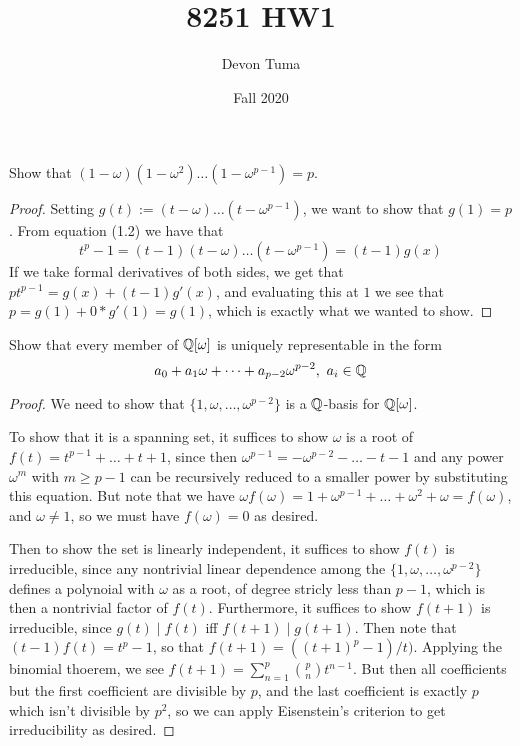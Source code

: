 \documentclass[11pt]{article}
\title{8251 HW1}
\author{Devon Tuma}
\date{Fall 2020}
\begin{document}
\maketitle

Show that $(1 - \omega)(1 - \omega^2)\dots(1 - \omega^{p-1}) = p$.

\begin{proof}
  Setting $g(t) := (t - \omega)\dots(t - \omega^{p-1})$, we want to show that $g(1) = p$.
  From equation (1.2) we have that
  \begin{equation*}
    t^p - 1 = (t - 1)(t - \omega)\dots(t - \omega^{p-1}) = (t-1)g(x)
  \end{equation*}
  If we take formal derivatives of both sides, we get that $pt^{p-1} = g(x) + (t-1)g'(x)$, and evaluating this at $1$ we see that $p = g(1) + 0 * g'(1) = g(1)$, which is exactly what we wanted to show.
\end{proof}


Show that every member of $\mathbb{Q}[\omega]$ is uniquely representable in the form $$a_0 + a_1\omega + \dots + a_{p-2}\omega^{p-2}, \ a_i \in \mathbb{Q}$$

\begin{proof}
  We need to show that $\{1, \omega, \dots, \omega^{p-2}\}$ is a $\mathbb{Q}$-basis for $\mathbb{Q}[\omega]$.
  
  To show that it is a spanning set, it suffices to show $\omega$ is a root of $f(t) = t^{p-1} + \dots + t + 1$, since then $\omega^{p-1} = -\omega^{p-2}-\dots-t-1$ and any power $\omega^m$ with $m \ge p - 1$ can be recursively reduced to a smaller power by substituting this equation.
  But note that we have $\omega f(\omega) = 1 + \omega^{p-1} + \dots + \omega^2 + \omega = f(\omega)$, and $\omega \ne 1$, so we must have $f(\omega) = 0$ as desired.

  Then to show the set is linearly independent, it suffices to show $f(t)$ is irreducible, since any nontrivial linear dependence among the $\{1, \omega, \dots, \omega^{p-2}\}$ defines a polynoial with $\omega$ as a root, of degree stricly less than $p-1$, which is then a nontrivial factor of $f(t)$.
  Furthermore, it suffices to show $f(t+1)$ is irreducible, since $g(t) \mid f(t)$ iff $f(t+1) \mid g(t+1)$. Then note that $(t-1)f(t) = t^p - 1$, so that $f(t+1) = ((t+1)^p - 1) / t)$.
  Applying the binomial thoerem, we see $f(t+1) = \sum_{n = 1}^p \binom{p}{n} t^{n-1}$.
  But then all coefficients but the first coefficient are divisible by $p$, and the last coefficient is exactly $p$ which isn't divisible by $p^2$, so we can apply Eisenstein's criterion to get irreducibility as desired.
\end{proof}
\end{document}
